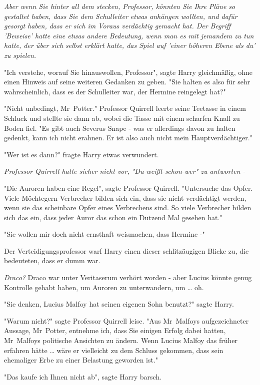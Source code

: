 {\emph{Aber wenn Sie hinter all dem stecken, Professor, könnten Sie Ihre Pläne so gestaltet haben, dass Sie dem Schulleiter etwas anhängen wollten, und dafür gesorgt haben, dass er sich im Voraus verdächtig gemacht hat. Der Begriff 'Beweise' hatte eine etwas andere Bedeutung, wenn man es mit jemandem zu tun hatte, der über sich selbst erklärt hatte, das Spiel auf 'einer höheren Ebene als du' zu spielen.}

"Ich verstehe, worauf Sie hinauswollen, Professor", sagte Harry gleichmäßig, ohne einen Hinweis auf seine weiteren Gedanken zu geben. "Sie halten es also für sehr wahrscheinlich, dass es der Schulleiter war, der Hermine reingelegt hat?"

"Nicht unbedingt, Mr~Potter." Professor Quirrell leerte seine Teetasse in einem Schluck und stellte sie dann ab, wobei die Tasse mit einem scharfen Knall zu Boden fiel. "Es gibt auch Severus Snape - was er allerdings davon zu halten gedenkt, kann ich nicht erahnen. Er ist also auch nicht mein Hauptverdächtiger."

"Wer ist es dann?" fragte Harry etwas verwundert.

\emph{Professor Quirrell hatte sicher nicht vor, "Du-weißt-schon-wer" zu antworten -}

"Die Auroren haben eine Regel", sagte Professor Quirrell. "Untersuche das Opfer. Viele Möchtegern-Verbrecher bilden sich ein, dass sie nicht verdächtigt werden, wenn sie das scheinbare Opfer eines Verbrechens sind. So viele Verbrecher bilden sich das ein, dass jeder Auror das schon ein Dutzend Mal gesehen hat."

"Sie wollen mir doch nicht ernsthaft weismachen, dass Hermine -"

Der Verteidigungsprofessor warf Harry einen dieser schlitzäugigen Blicke zu, die bedeuteten, dass er dumm war.

\emph{Draco?} Draco war unter Veritaserum verhört worden - aber Lucius könnte genug Kontrolle gehabt haben, um Auroren zu unterwandern, um … oh.

"Sie denken, Lucius Malfoy hat seinen eigenen Sohn benutzt?" sagte Harry.

"Warum nicht?" sagte Professor Quirrell leise. "Aus Mr~Malfoys aufgezeichneter Aussage, Mr~Potter, entnehme ich, dass Sie einigen Erfolg dabei hatten, Mr~Malfoys politische Ansichten zu ändern. Wenn Lucius Malfoy das früher erfahren hätte … wäre er vielleicht zu dem Schluss gekommen, dass sein ehemaliger Erbe zu einer Belastung geworden ist."

"Das kaufe ich Ihnen nicht ab", sagte Harry barsch.

}
